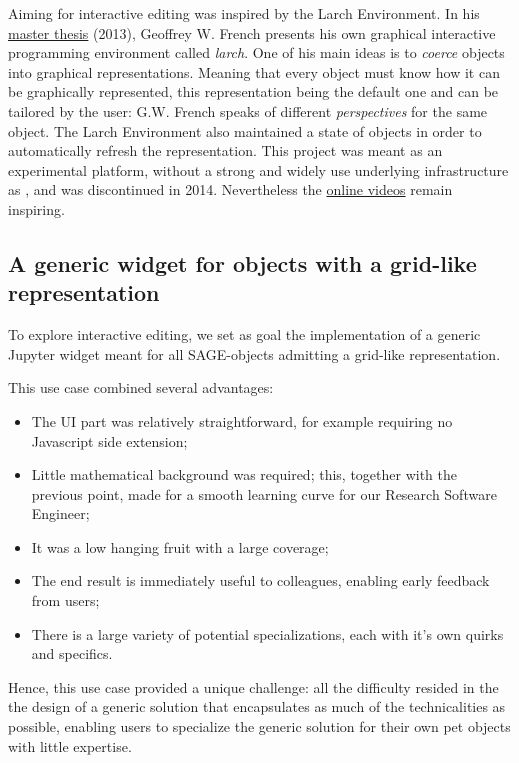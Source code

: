 \documentclass{deliverablereport}
\begin{document}
Aiming for interactive editing was inspired by the Larch Environment.
In his \href{https://core.ac.uk/download/pdf/9839511.pdf}{master
  thesis} (2013), Geoffrey W. French presents his own graphical
interactive programming environment called \emph{larch}. One of his
main ideas is to \emph{coerce} objects into graphical representations.
Meaning that every object must know how it can be graphically
represented, this representation being the default one and can be
tailored by the user: G.W. French speaks of different
\emph{perspectives} for the same object. The Larch Environment also
maintained a state of objects in order to automatically refresh the
representation. This project was meant as an experimental platform,
without a strong and widely use underlying infrastructure as \Jupyter,
and was discontinued in 2014. Nevertheless the
\href{https://www.youtube.com/watch?v=BaqaIw2c91o&t=29s}{online videos}
remain inspiring.

\subsection{A generic widget for objects with a grid-like representation}
\label{section:grid}

To explore interactive editing, we set as goal the implementation of a
generic Jupyter widget meant for all SAGE-objects admitting a
grid-like representation.


This use case combined several advantages:
\begin{itemize}
\item The UI part was relatively straightforward, for example
  requiring no Javascript side extension;
\item Little mathematical background was required; this, together with
  the previous point, made for a smooth learning curve for our
  Research Software Engineer;
\item It was a low hanging fruit with a large coverage;
\item The end result is immediately useful to colleagues, enabling
  early feedback from users;
\item There is a large variety of potential specializations, each with
  it's own quirks and specifics.
\end{itemize}
Hence, this use case provided a unique challenge: all the difficulty
resided in the the design of a generic solution that encapsulates as
much of the technicalities as possible, enabling users to specialize
the generic solution for their own pet objects with little expertise.
\end{document}
